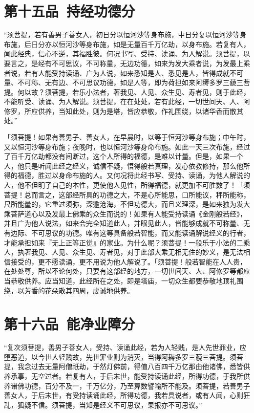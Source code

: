 \documentclass[12pt,twoside,openany]{book}
\newcommand{\kai}[1]{{\CJKfamily{kai}#1}}
\begin{document}
\chapter{第十五品\ 持经功德分}
\begin{pinyinscope}
“须菩提，若有善男子善女人，初日分以恒河沙等身布施，中日分复以恒河沙等身布施，后日分亦以恒河沙等身布施，如是无量百千万亿劫，以身布施。若复有人，闻此经典，信心不逆，其福胜彼。何况书写、受持、读诵、为人解说。须菩提，以要言之，是经有不可思议，不可称量，无边功德，如来为发大乘者说，为发最上乘者说，若有人能受持读诵、广为人说，如来悉知是人、悉见是人，皆得成就不可量、不可称、无有边、不可思议功德，如是人等，即为荷担如来阿耨多罗三藐三菩提。何以故？须菩提，若乐小法者，著我见、人见、众生见、寿者见，则于此经，不能听受、读诵、为人解说。须菩提，在在处处，若有此经，一切世间天、人、阿修罗，所应供养，当知此处，则为是塔，皆应恭敬，作礼围绕，以诸华香而散其处。”
\end{pinyinscope}

\kai{「须菩提！如果有善男子、善女人，在早晨时，以等于恒河沙等身布施；中午时，又以恒河沙等身布施；夜晚时，也以恒河沙等身命布施。如此一天三次布施，经过了百千万亿劫都没有间断过，这个人所得的福德，是难以计量。但是，如果一个人，他只是听闻此经之经义，诚信不疑，悟得般若真理，发心依教修持，那么他所得的福德，胜过以身命布施的人。又何况将此经书写、受持、读诵，为他人解说的人，他不但明了自己的本性，更使他人见性，所得福德，就更加不可胜数了！「须菩提！总而言之，这部经所具的功德之大，不是心所能思，口所能议，秤所能称，尺所能量的，它重过须弥，深逾沧海，不但功德大，而且义理深，是如来独为发大乘菩萨道心以及发最上佛乘的众生而说的！如果有人能受持读诵《金刚般若经》，并且广为他人说法，如来会完全知道此人，并眼见此人，皆能够成就不可称量、无有边际、不可思议的功德。唯有这等具备般若智能，而又能读诵解说经义的行者，才能承担如来『无上正等正觉』的家业。为什么呢？须菩提！一般乐于小法的二乘人，执著我见、人见、众生见、寿者见，对于此部大乘无相无住的妙义，是无法相信接受的，更不愿读诵，更不用说为他人解说了。「须菩提！般若智能在人人贵，在处处尊，所以不论何处，只要有这部经的地方，一切世间天、人、阿修罗等都应当恭敬供养。应当知道，此经所在之处，即是塔庙，一切众生都要恭敬地顶礼围绕，以芳香的花朵散其四周，虔诚地供养。}

\chapter{第十六品\ 能净业障分}
\begin{pinyinscope}
“复次须菩提，善男子善女人，受持、读诵此经，若为人轻贱，是人先世罪业，应堕恶道，以今世人轻贱故，先世罪业则为消灭，当得阿耨多罗三藐三菩提。须菩提，我念过去无量阿僧祇劫，于然灯佛前，得值八百四千万亿那由他诸佛，悉皆供养承事，无空过者。若复有人，于后末世，能受持读诵此经，所得功德，于我所供养诸佛功德，百分不及一，千万亿分，乃至算数譬喻所不能及。须菩提，若善男子善女人，于后末世，有受持读诵此经，所得功德，我若具说者，或有人闻，心则狂乱，狐疑不信。须菩提，当知是经义不可思议，果报亦不可思议。”
\end{pinyinscope}
\end{document}
